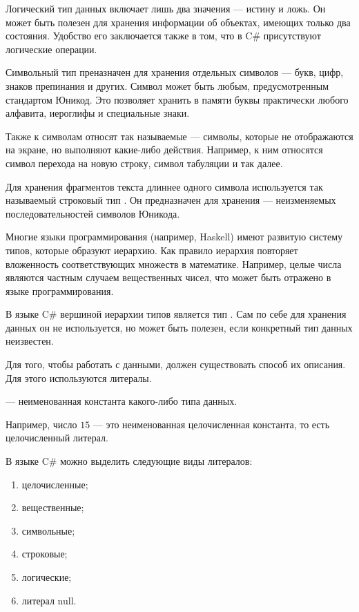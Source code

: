 Логический тип данных  включает лишь два значения — истину и
ложь. Он может быть полезен для хранения информации об объектах,
имеющих только два состояния. Удобство его заключается также в том,
что в C\# присутствуют логические операции.


Символьный тип  преназначен для хранения отдельных символов —
букв, цифр, знаков препинания и других. Символ может быть любым,
предусмотренным стандартом Юникод. Это позволяет хранить в памяти
буквы практически любого алфавита, иероглифы и специальные знаки.

Также к символам относят так называемые  — символы,
которые не отображаются на экране, но выполняют какие-либо
действия. Например, к ним относятся символ перехода на новую строку,
символ табуляции и так далее.


Для хранения фрагментов текста длиннее одного символа используется так
называемый строковый тип . Он предназначен для хранения
 — неизменяемых последовательностей символов
Юникода.


Многие языки программирования (например, Haskell) имеют развитую
систему типов, которые образуют иерархию. Как правило иерархия
повторяет вложенность соответствующих множеств в математике. Например,
целые числа являются частным случаем вещественных чисел, что может
быть отражено в языке программирования.

В языке C\# вершиной иерархии типов является тип .  Сам
по себе для хранения данных он не используется, но может быть полезен,
если конкретный тип данных неизвестен.


Для того, чтобы работать с данными, должен существовать способ их
описания. Для этого используются литералы.

\begin{defn}
   — неименованная константа какого-либо типа
  данных.
\end{defn}

Например, число $15$ — это неименованная целочисленная константа, то
есть целочисленный литерал.

В языке C\# можно выделить следующие виды литералов:
\begin{enumerate}
\item целочисленные;
\item вещественные;
\item символьные;
\item строковые;
\item логические;
\item литерал null.
\end{enumerate}

